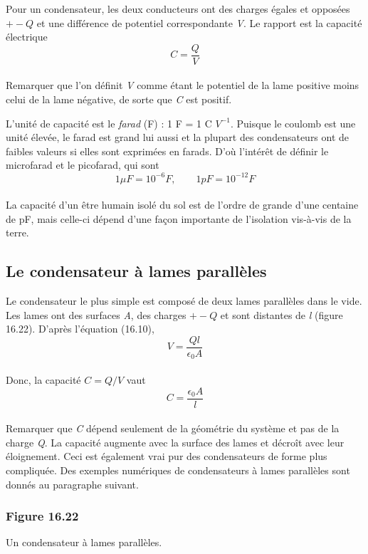 \documentclass[../main.tex]{subfiles}
\begin{document}
\par Pour un condensateur, les deux conducteurs ont des charges égales et opposées $+- Q$ et une différence de potentiel correspondante \textit{V}. Le rapport est la capacité électrique \\
$$C = \frac{Q}{V}$$\\
Remarquer que l'on définit \textit{V} comme étant le potentiel de la lame positive moins celui de la lame négative, de sorte que \textit{C} est positif.\\
\par L'unité de capacité est le \textit{farad} (F) : 1 F = 1 C $V^{-1}$. Puisque le coulomb est une unité élevée, le farad est grand lui aussi et la plupart des condensateurs ont de faibles valeurs si elles sont exprimées en farads. D'où l'intérêt de définir le microfarad et le picofarad, qui sont \\
$$1 \mu F = 10^{-6}F, \qquad 1pF = 10^{-12}F$$\\
La capacité d'un être humain isolé du sol est de l'ordre de grande d'une centaine de pF, mais celle-ci dépend d'une façon importante de l'isolation vis-à-vis de la terre.\\
\subsection{Le condensateur à lames parallèles}
Le condensateur le plus simple est composé de deux lames parallèles dans le vide. Les lames ont des surfaces \textit{A}, des charges $+-Q$ et sont distantes de \textit{l} (figure 16.22). D'après l'équation (16.10),\\
$$V = \frac{Ql}{\epsilon_0A}$$\\
Donc, la capacité $C = Q/V$ vaut \\
$$C = \frac{\epsilon_0A}{l}$$\\
Remarquer que \textit{C} dépend seulement de la géométrie du système et pas de la charge \textit{Q}. La capacité augmente avec la surface des lames et décroît avec leur éloignement. Ceci est également vrai pur des condensateurs de forme plus compliquée. Des exemples numériques de condensateurs à lames parallèles sont donnés au paragraphe suivant.\\
\subsubsection*{Figure 16.22}
Un condensateur à lames parallèles.
\end{document}
